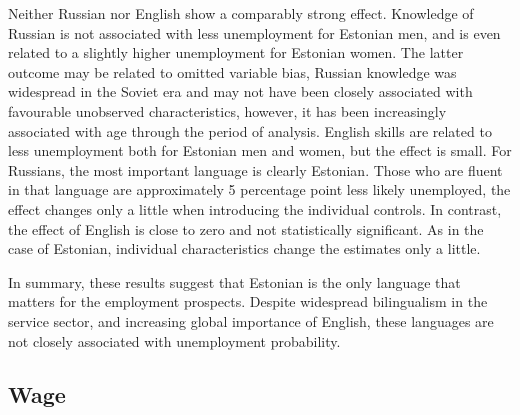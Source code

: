 \documentclass[12pt, a4paper]{article}
\newcommand{\V}{\ensuremath\checkmark}
\def\tenpc{$^{\ast}$}
\def\fivepc{$^{\ast\ast}$}
\def\onepc{$^{\ast\ast\ast}$}
\newcommand{\legend}{\normalsize{Significance levels:\hspace{1em} \tenpc : 10\% \hspace{1em} \fivepc : 5\% \hspace{1em} \onepc : 1\% \normalsize}}
\newcommand{\modelTwo}{age, age\textsuperscript{2}, education, marriage, number of children, inter-ethnic household}
\newcommand{\restrictions}{The sample period is from year 2000 to year 2012. Sample is limited to persons
	25-55
     
 year old.}
\begin{document}
\begin{table}[h]
\begin{center}
	\end{center}
\end{table}%

Neither Russian nor English show a comparably strong effect.
Knowledge of Russian is not associated with less unemployment for
Estonian men, and is even related to a slightly higher unemployment
for Estonian women. The latter outcome may be related to omitted
variable bias, Russian knowledge was widespread in the Soviet era and may
not have been closely associated with favourable unobserved
characteristics, however, it has been increasingly associated with age
through the period of analysis.
English skills are related to less unemployment both for Estonian men
and women, but the effect is small.
For Russians, the most important language is clearly Estonian. Those who are
fluent in that language are approximately 5 percentage point less likely
unemployed, the effect changes only a little when introducing the
individual controls. In contrast, the effect of English
is close to zero and not statistically significant. As in the
case of Estonian, individual characteristics change the estimates only
a little.

In summary, these results suggest that Estonian is the only language
that matters for the employment prospects. Despite widespread
bilingualism in the service sector, and increasing global importance of
English, these languages are not closely associated with unemployment
probability. 

\subsection{Wage}
\label{subsec:basic_model_wage}
\end{document}
